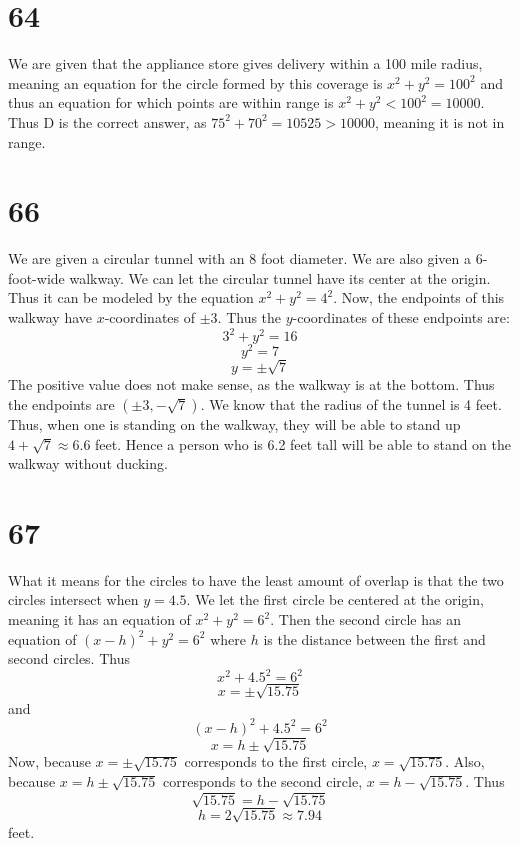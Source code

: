 \documentclass{article}
\theoremstyle{definition}
\newcommand{\?}{\stackrel{?}{=}}
\begin{document}
\section*{64}
We are given that the appliance store gives delivery within a 100 mile radius, meaning an equation for the circle formed by this coverage is $x^2+y^2=100^2$ and 
thus an equation for which points are within range is $x^2+y^2<100^2=10000$. Thus D is the correct answer, as 
$75^2+70^2=10525>10000$, meaning it is not in range.

\section*{66}
We are given a circular tunnel with an 8 foot diameter. We are also given a 6-foot-wide walkway. We can let the circular tunnel have its center at the origin. Thus 
it can be modeled by the equation $x^2+y^2=4^2$. Now, the endpoints of this walkway have $x$-coordinates of $\pm 3$. Thus the $y$-coordinates of these endpoints are:
\[ 3^2+y^2=16 \] \[ y^2=7 \] \[ y=\pm\sqrt{7} \] The positive value does not make sense, as the walkway is at the bottom. Thus the endpoints are $(\pm 3,-\sqrt{7})$. 
We know that the radius of the tunnel is 4 feet. Thus, when one is standing on the walkway, they will be able to stand up $4+\sqrt{7}\approx 6.6$ feet. Hence a person who is 
6.2 feet tall will be able to stand on the walkway without ducking. 

\section*{67}
What it means for the circles to have the least amount of overlap is that the two circles intersect when $y=4.5$. We let the first circle be centered at the origin, meaning 
it has an equation of $x^2+y^2=6^2$. Then the second circle has an equation of $(x-h)^2+y^2=6^2$ where $h$ is the distance between the first and second circles. Thus 
\[ x^2+4.5^2=6^2 \] \[ x=\pm\sqrt{15.75} \] and \[ (x-h)^2+4.5^2=6^2 \] \[ x=h\pm\sqrt{15.75} \] Now, because $x=\pm\sqrt{15.75}$ corresponds to the first circle, 
$x=\sqrt{15.75}$. Also, because $x=h\pm\sqrt{15.75}$ corresponds to the second circle, $x=h-\sqrt{15.75}$. Thus 
\[ \sqrt{15.75}=h-\sqrt{15.75} \] \[ h=2\sqrt{15.75}\approx 7.94 \] feet. 
\end{document}
